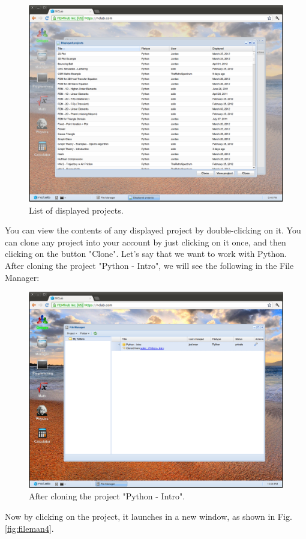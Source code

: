\documentclass[article,A4,12pt]{llncs}
\begin{document}
\newpage

\begin{figure}[!ht]
\begin{center}
\includegraphics[width=\textwidth]{img/fileman2.png}
\end{center}
\caption{List of displayed projects.}
\label{fig:fileman2}
\end{figure}
\noindent
You can view the contents of any displayed project by double-clicking on it. You can 
clone any project into your account by just clicking on it once, and then clicking on 
the button "Clone". Let's say that we want to work with Python. After cloning 
the project "Python - Intro", we will see the following in the File Manager:

\newpage

\begin{figure}[!ht]
\begin{center}
\includegraphics[width=\textwidth]{img/fileman3.png}
\end{center}
\caption{After cloning the project "Python - Intro".}
\label{fig:fileman3}
\end{figure}
\noindent
Now by clicking on the project, it launches in a new window, as
shown in Fig. \ref{fig:fileman4}.
\end{document}
